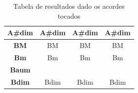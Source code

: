 \begin{table}[ht!]
{\begin{tabular}{ | c | c | c | c |}
  \hline
  \textbf{A\#dim} & A\#dim & A\#dim & A\#dim \\ 
  \hline
  \textbf{BM} & BM & BM & BM \\ 
  \hline
  \textbf{Bm} & Bm & Bm & Bm \\ 
  \hline
  \textbf{Baum} & \color{red}{D\#aum} & \color{red}{D\#aum} & \color{red}{D\#aum} \\ 
  \hline
  \textbf{Bdim} & Bdim & Bdim & Bdim \\ 
  \hline
\end{tabular}
}
\caption{Tabela de resultados dado os acordes tocados}
\label{tab:label_test}
\end{table}


